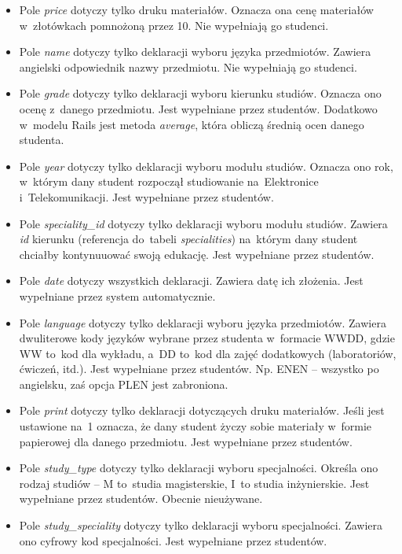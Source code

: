 \documentclass[a4paper,12pt,oneside]{report}
\begin{document}
\begin{itemize}
  \item Pole \emph{price} dotyczy tylko druku materiałów. Oznacza ona cenę materiałów w~złotówkach pomnożoną przez 10. Nie wypełniają go studenci.
  \item Pole \emph{name} dotyczy tylko deklaracji wyboru języka przedmiotów. Zawiera angielski odpowiednik nazwy przedmiotu. Nie wypełniają go studenci.
  \item Pole \emph{grade} dotyczy tylko deklaracji wyboru kierunku studiów. Oznacza ono ocenę z~danego przedmiotu. Jest wypełniane przez studentów. Dodatkowo w~modelu Rails jest metoda \emph{average}, która obliczą średnią ocen danego studenta.
  \item Pole \emph{year} dotyczy tylko deklaracji wyboru modułu studiów. Oznacza ono rok, w~którym dany student rozpoczął studiowanie na~Elektronice i~Telekomunikacji. Jest wypełniane przez studentów.
  \item Pole \emph{speciality\_id} dotyczy tylko deklaracji wyboru modułu studiów. Zawiera \emph{id} kierunku (referencja do~tabeli \emph{specialities}) na~którym dany student chciałby kontynuuować swoją edukację. Jest wypełniane przez studentów.
  \item Pole \emph{date} dotyczy wszystkich deklaracji. Zawiera datę ich złożenia. Jest wypełniane przez system automatycznie.
  \item Pole \emph{language} dotyczy tylko deklaracji wyboru języka przedmiotów. Zawiera dwuliterowe kody języków wybrane przez studenta w~formacie WWDD, gdzie WW to~kod dla wykładu, a~DD to~kod dla zajęć dodatkowych (laboratoriów, ćwiczeń, itd.). Jest wypełniane przez studentów. Np. ENEN -- wszystko po angielsku, zaś opcja PLEN jest zabroniona.
  \item Pole \emph{print} dotyczy tylko deklaracji dotyczących druku materiałów. Jeśli jest ustawione na~1 oznacza, że dany student życzy sobie materiały w~formie papierowej dla danego przedmiotu. Jest wypełniane przez studentów.
  \item Pole \emph{study\_type} dotyczy tylko deklaracji wyboru specjalności. Określa ono rodzaj studiów -- M to~studia magisterskie, I~to studia inżynierskie. Jest wypełniane przez studentów. Obecnie nieużywane.
  \item Pole \emph{study\_speciality} dotyczy tylko deklaracji wyboru specjalności. Zawiera ono cyfrowy kod specjalności. Jest wypełniane przez studentów.
\end{itemize}
\end{document}
